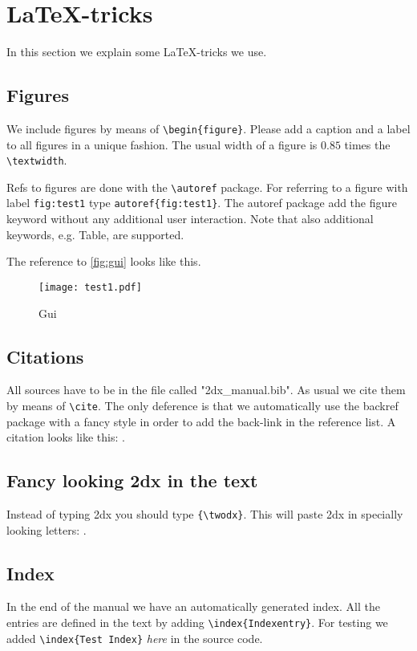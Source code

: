 \section{\LaTeX-tricks}

In this section we explain some \LaTeX-tricks we use.

\subsection{Figures} 

We include figures by means of \texttt{\textbackslash begin\{figure\}}. Please add a caption and a label to all figures in a unique fashion. The usual width of a figure is $0.85$ times the \texttt{\textbackslash textwidth}.

Refs to figures are done with the \texttt{\textbackslash autoref} package. For referring to a figure with label \texttt{fig:test1} type \texttt{autoref\{fig:test1\}}. The autoref package add the figure keyword without any additional user interaction. Note that also additional keywords, e.g. Table, are supported.

The reference to \autoref{fig:gui} looks like this.

\begin{figure}[h]
	\centering
	\texttt{[image: test1.pdf]}
	\caption{{\twodx} Gui}
	\label{fig:gui}
\end{figure}

\subsection{Citations}

All sources have to be in the file called "2dx\_manual.bib". As usual we cite them by means of \texttt{\textbackslash cite}. The only deference is that we automatically use the backref package with a fancy style in order to add the back-link in the reference list. A citation looks like this: \cite{Test}.

\subsection{Fancy looking 2dx in the text}
Instead of typing 2dx you should type \texttt{\{\textbackslash twodx\}}. This will paste 2dx in specially looking letters: {\twodx}.

\subsection{Index}
In the end of the manual we have an automatically generated index. All the entries are defined in the text by adding \texttt{\textbackslash index\{Indexentry\}}. For testing we added \texttt{\textbackslash index\{Test Index\}} \textit{here}  in the source code. 

